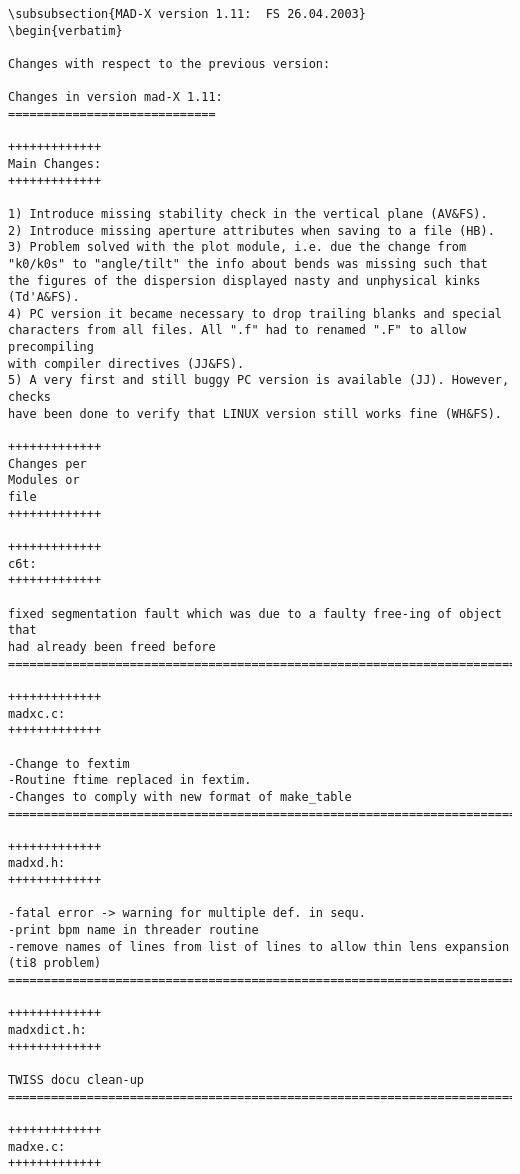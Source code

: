 \begin{verbatim}
\subsubsection{MAD-X version 1.11:  FS 26.04.2003}
\begin{verbatim}

Changes with respect to the previous version:

Changes in version mad-X 1.11:
=============================

+++++++++++++
Main Changes:
+++++++++++++

1) Introduce missing stability check in the vertical plane (AV&FS).
2) Introduce missing aperture attributes when saving to a file (HB).
3) Problem solved with the plot module, i.e. due the change from
"k0/k0s" to "angle/tilt" the info about bends was missing such that 
the figures of the dispersion displayed nasty and unphysical kinks (Td'A&FS).
4) PC version it became necessary to drop trailing blanks and special
characters from all files. All ".f" had to renamed ".F" to allow precompiling
with compiler directives (JJ&FS).
5) A very first and still buggy PC version is available (JJ). However, checks
have been done to verify that LINUX version still works fine (WH&FS).

+++++++++++++
Changes per
Modules or
file
+++++++++++++

+++++++++++++
c6t: 
+++++++++++++

fixed segmentation fault which was due to a faulty free-ing of object that
had already been freed before
=============================================================================

+++++++++++++
madxc.c: 
+++++++++++++

-Change to fextim
-Routine ftime replaced in fextim.
-Changes to comply with new format of make_table
=============================================================================

+++++++++++++
madxd.h:
+++++++++++++

-fatal error -> warning for multiple def. in sequ.
-print bpm name in threader routine
-remove names of lines from list of lines to allow thin lens expansion (ti8 problem)
=============================================================================

+++++++++++++
madxdict.h:
+++++++++++++

TWISS docu clean-up
=============================================================================

+++++++++++++
madxe.c:
+++++++++++++


\end{verbatim}

